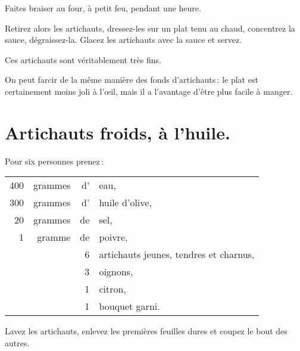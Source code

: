 Faites braiser au four, à petit feu, pendant une heure.

Retirez alors les artichauts, dressez-les sur un plat tenu au chaud, concentrez
la sauce, dégraissez-la. Glacez les artichauts avec la sauce et servez.

Ces artichauts sont véritablement très fins.

\sk

On peut farcir de la même manière des fonds d’artichauts : le plat est
certainement moins joli à l'œil, mais il a l'avantage d’être plus facile
à manger.

\section*{\centering Artichauts froids, à l'huile.}
{}

Pour six personnes prenez :

\footnotesize
\begin{longtable}{rrrp{16em}}
    400 & grammes & d' & eau,                                                                             \\
    300 & grammes & d' & huile d'olive,                                                                   \\
     20 & grammes & de & sel,                                                                             \\
      1 & gramme  & de & poivre,                                                                          \\
        &         &  6 & artichauts jeunes, tendres et charnus,                                           \\
        &         &  3 & oignons,                                                                         \\
        &         &  1 & citron,                                                                          \\
        &         &  1 & bouquet garni.                                                                   \\
\end{longtable}
\normalsize

Lavez les artichauts, enlevez les premières feuilles dures et coupez le bout
des autres.

